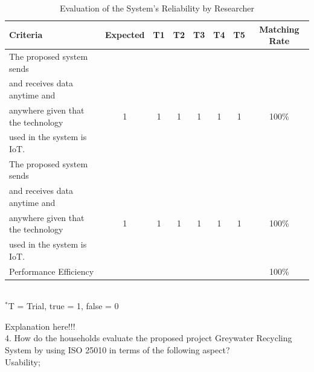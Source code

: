 \begin{table}[h!]
\caption{Evaluation of the System’s Reliability by Researcher}
\vspace{-1em}
\begin{center}
\fontsize{10}{12}\selectfont
\begin{tabular}{|| l c c c c c c c ||} 
 \hline
 Criteria & Expected & T1 & T2 & T3 & T4 & T5 & Matching Rate \\ [0.5ex] 
 \hline\hline
The proposed system sends &  &  &  &  &  &  &  \\
and receives data anytime and &  &  &  &  &  &  &  \\
anywhere given that the technology & 1 & 1 & 1 & 1 & 1 & 1 & 100\% \\
used in the system is IoT. &  &  &  &  &  &  &  \\ 
\hline
The proposed system sends &  &  &  &  &  &  &  \\
and receives data anytime and &  &  &  &  &  &  &  \\
anywhere given that the technology & 1 & 1 & 1 & 1 & 1 & 1 & 100\% \\
used in the system is IoT. &  &  &  &  &  &  &  \\ 
\hline
Performance Efficiency &  &  &  &  &  &  & 100\% \\ 
\hline
\end{tabular} \\
\footnotesize{\hspace{-10cm}$^*$T = Trial, true = 1, false = 0}
\end{center}
\end{table} 

Explanation here!!! \lipsum[1] \\

4. How do the households evaluate the proposed project Greywater Recycling System by using ISO 25010 in terms of the following aspect? \\ 

\indent\indent Usability; \\


